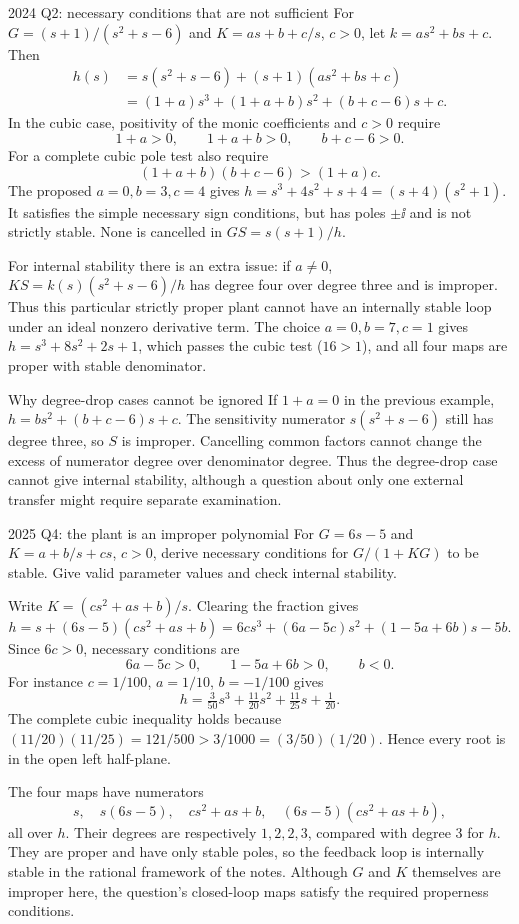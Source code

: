 \begin{worked}{2024 Q2: necessary conditions that are not sufficient}
For $G=(s+1)/(s^2+s-6)$ and $K=as+b+c/s$, $c>0$, let $k=as^2+bs+c$. Then
\begin{align*}
h(s)&=s(s^2+s-6)+(s+1)(as^2+bs+c)\\
&=(1+a)s^3+(1+a+b)s^2+(b+c-6)s+c.
\end{align*}
In the cubic case, positivity of the monic coefficients and $c>0$ require
\[1+a>0,\qquad1+a+b>0,\qquad b+c-6>0.\]
For a complete cubic pole test also require
\[(1+a+b)(b+c-6)>(1+a)c.\]
The proposed $a=0,b=3,c=4$ gives $h=s^3+4s^2+s+4=(s+4)(s^2+1)$. It satisfies the simple necessary sign conditions, but has poles $\pm\ii$ and is not strictly stable. None is cancelled in $GS=s(s+1)/h$.

For internal stability there is an extra issue: if $a\ne0$, $KS=k(s)(s^2+s-6)/h$ has degree four over degree three and is improper. Thus this particular strictly proper plant cannot have an internally stable loop under an ideal nonzero derivative term. The choice $a=0,b=7,c=1$ gives $h=s^3+8s^2+2s+1$, which passes the cubic test ($16>1$), and all four maps are proper with stable denominator.
\end{worked}
\begin{concept}{Why degree-drop cases cannot be ignored}
If $1+a=0$ in the previous example, $h=bs^2+(b+c-6)s+c$. The sensitivity numerator $s(s^2+s-6)$ still has degree three, so $S$ is improper. Cancelling common factors cannot change the excess of numerator degree over denominator degree. Thus the degree-drop case cannot give internal stability, although a question about only one external transfer might require separate examination.
\end{concept}
\begin{question}{2025 Q4: the plant is an improper polynomial}
For $G=6s-5$ and $K=a+b/s+cs$, $c>0$, derive necessary conditions for $G/(1+KG)$ to be stable. Give valid parameter values and check internal stability.
\end{question}
\begin{answer}
Write $K=(cs^2+as+b)/s$. Clearing the fraction gives
\[h=s+(6s-5)(cs^2+as+b)=6cs^3+(6a-5c)s^2+(1-5a+6b)s-5b.\]
Since $6c>0$, necessary conditions are
\[6a-5c>0,\qquad1-5a+6b>0,\qquad b<0.\]
For instance $c=1/100$, $a=1/10$, $b=-1/100$ gives
\[h=\tfrac3{50}s^3+\tfrac{11}{20}s^2+\tfrac{11}{25}s+\tfrac1{20}.\]
The complete cubic inequality holds because $(11/20)(11/25)=121/500>3/1000=(3/50)(1/20)$. Hence every root is in the open left half-plane.

The four maps have numerators
\[s,\quad s(6s-5),\quad cs^2+as+b,\quad(6s-5)(cs^2+as+b),\]
all over $h$. Their degrees are respectively $1,2,2,3$, compared with degree $3$ for $h$. They are proper and have only stable poles, so the feedback loop is internally stable in the rational framework of the notes. Although $G$ and $K$ themselves are improper here, the question's closed-loop maps satisfy the required properness conditions.
\end{answer}
